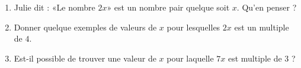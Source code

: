 
\begin{exercice}\label{exosmath-0938}

    \begin{enumerate}
        \item
            Julie dit : «Le nombre \( 2x\)» est un nombre pair quelque soit \( x\). Qu'en penser ?
        \item        
            Donner quelque exemples de valeurs de \( x\) pour lesquelles \( 2x\) est un multiple de \( 4\).
        \item
            Est-il possible de trouver une valeur de \( x\) pour laquelle \( 7x\) est multiple de \( 3\) ?
    \end{enumerate}

\end{exercice}
